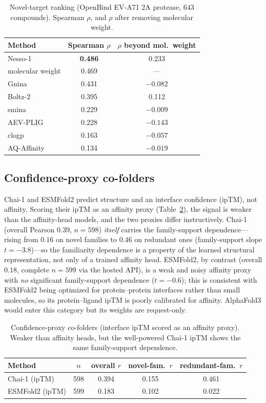 \documentclass[11pt]{article}
\begin{document}
\begin{table}[t]
\centering\small
\caption{Novel-target ranking (OpenBind EV-A71 2A protease, $643$ compounds). Spearman $\rho$, and
$\rho$ after removing molecular weight.}
\label{tab:temporal}
\begin{tabular}{lcc}
\toprule
Method & Spearman $\rho$ & $\rho$ beyond mol.\ weight \\
\midrule
Nesso-1            & \textbf{0.486} & 0.233 \\
molecular weight   & 0.469 & --- \\
Gnina              & 0.431 & $-0.082$ \\
Boltz-2            & 0.395 & 0.112 \\
smina              & 0.229 & $-0.009$ \\
AEV-PLIG           & 0.228 & $-0.143$ \\
clogp              & 0.163 & $-0.057$ \\
AQ-Affinity        & 0.134 & $-0.019$ \\
\bottomrule
\end{tabular}
\end{table}

\subsection{Confidence-proxy co-folders}
\label{sec:proxy}

Chai-1 and ESMFold2 predict structure and an interface confidence (ipTM), not affinity. Scoring
their ipTM as an affinity proxy (Table~\ref{tab:proxy}), the signal is weaker than the
affinity-head models, and the two proxies differ instructively. Chai-1 (overall Pearson $0.39$,
$n{=}598$) \emph{itself} carries the family-support dependence---rising from $0.16$ on novel
families to $0.46$ on redundant ones (family-support slope $t=-3.8$)---so the familiarity
dependence is a property of the learned structural representation, not only of a trained affinity
head. ESMFold2, by contrast (overall $0.18$, complete $n{=}599$ via the hosted API), is a weak and noisy
affinity proxy with \emph{no} significant family-support dependence ($t=-0.6$); this is consistent
with ESMFold2 being optimized for protein--protein interfaces rather than small molecules, so its
protein--ligand ipTM is poorly calibrated for affinity. AlphaFold3 would enter this category but
its weights are request-only.

\begin{table}[t]
\centering\small
\caption{Confidence-proxy co-folders (interface ipTM scored as an affinity proxy). Weaker than
affinity heads, but the well-powered Chai-1 ipTM shows the same family-support dependence.}
\label{tab:proxy}
\begin{tabular}{lcccc}
\toprule
Method & $n$ & overall $r$ & novel-fam.\ $r$ & redundant-fam.\ $r$ \\
\midrule
Chai-1 (ipTM)   & 598 & 0.394 & 0.155 & 0.461 \\
ESMFold2 (ipTM) & 599 & 0.183 & 0.102 & 0.022 \\
\bottomrule
\end{tabular}
\end{table}
\end{document}
